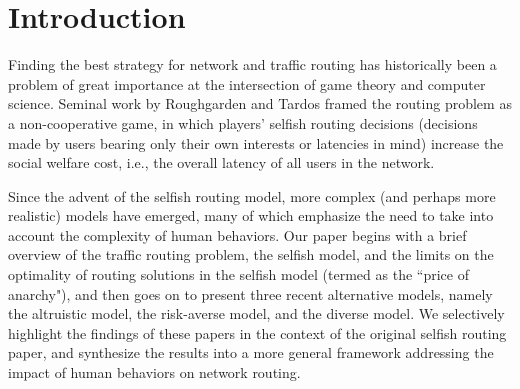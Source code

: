 \section{Introduction}
Finding the best strategy for network and traffic routing has historically been a problem of great importance at the intersection of game theory and computer science. 
Seminal work by Roughgarden and Tardos framed the routing problem as a non-cooperative game,
in which players' selfish routing decisions (decisions made by users bearing only their own interests or latencies in mind) increase the social welfare cost, i.e., the overall latency of all users in the network.


Since the advent of the selfish routing model, more complex (and perhaps more realistic) models have emerged, many of which emphasize the need to take into account the complexity of human behaviors. Our paper begins with a brief overview of the traffic routing problem, the selfish model, and the limits on the optimality of routing solutions in the selfish model (termed as the ``price of anarchy"), and then goes on to present three recent alternative models, namely the altruistic model, the risk-averse model, and the diverse model. We selectively highlight the findings of these papers in the context of the original selfish routing paper, and synthesize the results into a more general framework addressing the impact of human behaviors on network routing.


